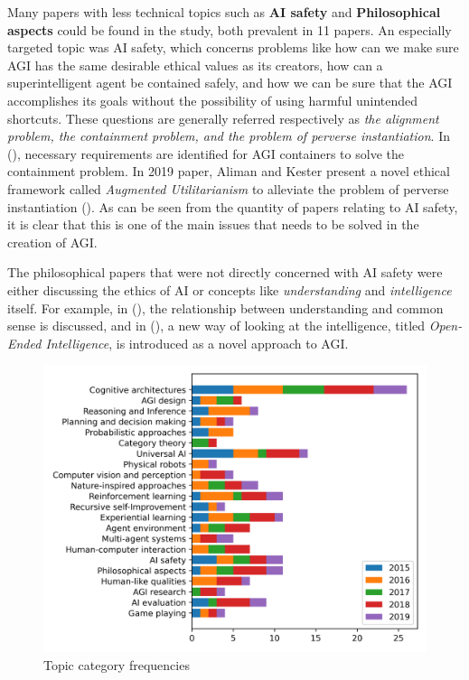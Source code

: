 Many papers with less technical topics such as \textbf{AI safety} and
\textbf{Philosophical aspects} could be found in the study, both prevalent in 11
papers. An especially targeted topic was AI safety, which concerns problems like
how can we make sure AGI has the same desirable ethical values as its creators,
how can a superintelligent agent be contained safely, and how we can be sure
that the AGI accomplishes its goals without the possibility of using harmful
unintended shortcuts. These questions are generally referred respectively as
\emph{the alignment problem, the containment problem, and the problem of
perverse instantiation}. In (\cite{babcock2016containment}), necessary
requirements are identified for AGI containers to solve the containment problem.
In 2019 paper, Aliman and Kester present a novel ethical framework called
\emph{Augmented Utilitarianism} to alleviate the problem of perverse
instantiation (\cite{aliman2019augmented}). As can be seen from the quantity of
papers relating to AI safety, it is clear that this is one of the main issues
that needs to be solved in the creation of AGI.

The philosophical papers that were not directly concerned with AI safety were
either discussing the ethics of AI or concepts like \emph{understanding} and
\emph{intelligence} itself. For example, in (\cite{thorisson2017understanding}),
the relationship between understanding and common sense is discussed, and in
(\cite[]{weinbaum2016Oopenended}), a new way of looking at the intelligence,
titled \emph{Open-Ended Intelligence}, is introduced as a novel approach to AGI.


\begin{figure}[H]
  \centering
  \includegraphics[scale=0.8]{material/data/topic_frequencies_by_year_asc.png}
  \caption{Topic category frequencies}
  \label{fig:topicbar}
\end{figure}

